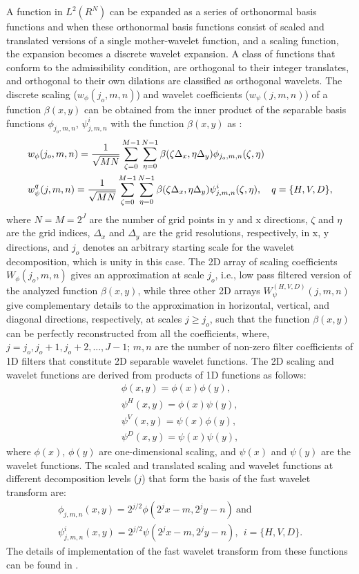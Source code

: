 A function in $L^{2}(R^{N})$ can be expanded as a series of orthonormal basis functions and when these orthonormal basis functions consist of scaled and translated versions of a single mother-wavelet function, and a scaling function, the expansion becomes a discrete wavelet expansion. A class of functions that conform to the admissibility condition, are orthogonal to their integer translates, and orthogonal to their own dilations \citep{daubechies88, book_burrus_gopi} are classified as orthogonal wavelets. The discrete scaling ($w_{\phi}(j_o,m,n)$) and wavelet coefficients ($w_{\psi}(j,m,n)$) of a function $\beta(x,y)$ can be obtained from the inner product of the separable basis functions $\phi_{j_o,m,n}$, $\psi_{j,m,n}^{i}$ with the function $\beta(x,y)$ as \citep{dim_gonzalez,book_burrus_gopi,rice_wavelet_toolbox}: 
\begin{align}
& w_{\phi}(j_o,m,n) = \frac{1}{\sqrt{MN}}\sum_{\zeta=0}^{M-1}\sum_{\eta=0}^{N-1}\beta(\zeta\Delta_x,\eta\Delta_y)\phi_{j_o,m,n}(\zeta,\eta) \notag \\ 
& w_{\psi}^q(j,m,n) = \frac{1}{\sqrt{MN}}\sum_{\zeta=0}^{M-1}\sum_{\eta=0}^{N-1}\beta(\zeta\Delta_x,\eta\Delta_y)\psi_{j,m,n}^{i}(\zeta,\eta), \ \ \ q=\{ H,V,D \},
\end{align}
\noindent where $N=M=2^{J}$ are the number of grid points in y and x directions, $\zeta$ and $\eta$ are the grid indices, $\Delta_x$ and $\Delta_y$ are the grid resolutions, respectively, in x, y directions, and $j_o$ denotes an arbitrary starting scale for the wavelet decomposition, which is unity in this case. The 2D array of scaling coefficients $W_{\phi}(j_o,m,n)$ gives an approximation at scale $j_o$, i.e., low pass filtered version of the analyzed function $\beta(x,y)$, while three other 2D arrays $W_{\psi}^{(H,V,D)}(j,m,n)$ give complementary details to the approximation in horizontal, vertical, and diagonal directions, respectively, at scales $j \geq j_o$, such that the function $\beta(x,y)$ can be perfectly reconstructed from all the coefficients, where, $j=j_o,j_o+1,j_o+2,...,J-1$; $m,n$ are the number of non-zero filter coefficients of 1D filters that constitute 2D separable wavelet functions. The 2D scaling and wavelet functions are derived from products of 1D functions as follows:
\begin{align}
  \phi(x,y) = \phi(x)\phi(y), \\
  \psi^{H}(x,y)=\phi(x)\psi(y), \\
  \psi^{V}(x,y)=\psi(x)\phi(y), \\
  \psi^{D}(x,y)=\psi(x)\psi(y),
\end{align}
where $\phi(x)$, $\phi(y)$ are one-dimensional scaling, and $\psi(x)$ and $\psi(y)$ are the wavelet functions. The scaled and translated  scaling and wavelet functions at different decomposition levels ($j$) that form the basis of the fast wavelet transform are:
\begin{align}
  \phi_{j,m,n}(x,y)=2^{j/2}\phi(2^{j}x-m, 2^{j}y-n)\ \text{and} \\
  \psi^{i}_{j,m,n}(x,y)=2^{j/2}\psi(2^{j}x-m, 2^{j}y-n), \ \ i=\{H, V, D\}.
\end{align}
The details of implementation of the fast wavelet transform from these functions can be found in \citep{dim_gonzalez,book_burrus_gopi}.

